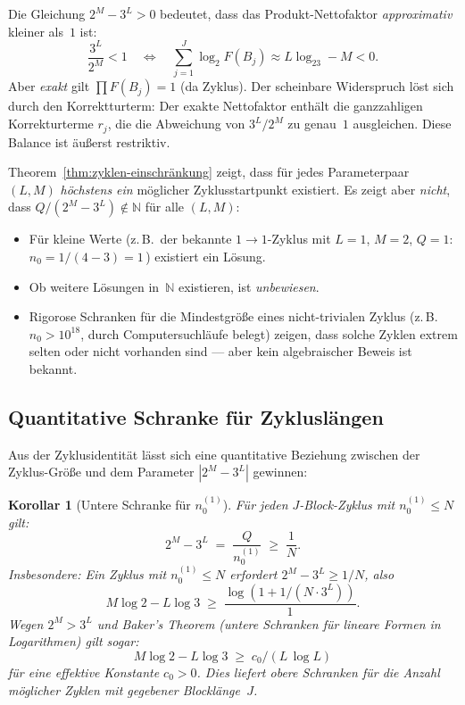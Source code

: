 \documentclass[12pt,a4paper]{article}
\newtheorem{korollar}[definition]{Korollar}
\newcommand{\N}{\mathbb{N}}
\newcommand{\logt}{\log_2}        %
\begin{document}
\begin{tcolorbox}[adisch, title={2-adische Interpretation}]
Die Gleichung $2^M - 3^L > 0$ bedeutet, dass das Produkt-Nettofaktor
\emph{approximativ} kleiner als~$1$ ist:
\[
  \frac{3^L}{2^M} < 1 \quad\Longleftrightarrow\quad
  \sum_{j=1}^{J}\logt F(B_j) \approx L\logt 3 - M < 0.
\]
Aber \emph{exakt} gilt $\prod F(B_j) = 1$ (da Zyklus). Der scheinbare
Widerspruch löst sich durch den Korrektturterm: Der exakte Nettofaktor
enthält die ganzzahligen Korrekturterme $r_j$, die die Abweichung von
$3^L/2^M$ zu genau~$1$ ausgleichen. Diese Balance ist äußerst restriktiv.
\end{tcolorbox}

\begin{tcolorbox}[lücke, title={Was die Zyklusidentität nicht beweist}]
Theorem~\ref{thm:zyklen-einschränkung} zeigt, dass für jedes Parameterpaar
$(L, M)$ \emph{höchstens ein} möglicher Zyklusstartpunkt existiert.
Es zeigt aber \emph{nicht}, dass $Q/(2^M-3^L) \notin \N$ für alle $(L,M)$:

\begin{itemize}[leftmargin=*]
  \item Für kleine Werte (z.\,B.\ der bekannte $1\to1$-Zyklus mit $L=1$,
    $M=2$, $Q=1$: $n_0 = 1/(4-3) = 1$\,\checkmark) existiert ein Lösung.
  \item Ob weitere Lösungen in~$\N$ existieren, ist \emph{unbewiesen}.
  \item Rigorose Schranken für die Mindestgröße eines nicht-trivialen Zyklus
    (z.\,B.\ $n_0 > 10^{18}$, durch Computersuchläufe belegt) zeigen, dass
    solche Zyklen extrem selten oder nicht vorhanden sind --- aber kein
    algebraischer Beweis ist bekannt.
\end{itemize}
\end{tcolorbox}

\subsection{Quantitative Schranke für Zykluslängen}

Aus der Zyklusidentität lässt sich eine quantitative Beziehung zwischen
der Zyklus-Größe und dem Parameter $|2^M - 3^L|$ gewinnen:

\begin{korollar}[Untere Schranke für $n_0^{(1)}$]
\label{kor:groesse}
Für jeden $J$-Block-Zyklus mit $n_0^{(1)} \leq N$ gilt:
\[
  2^M - 3^L \;=\; \frac{Q}{n_0^{(1)}} \;\geq\; \frac{1}{N}.
\]
Insbesondere: Ein Zyklus mit $n_0^{(1)} \leq N$ erfordert
$2^M - 3^L \geq 1/N$, also
\[
  M\log 2 - L\log 3 \;\geq\; \frac{\log(1 + 1/(N\cdot 3^L))}{1}.
\]
Wegen $2^M > 3^L$ und Baker's Theorem (untere Schranken für lineare
Formen in Logarithmen) gilt sogar:
\[
  M\log 2 - L\log 3 \;\geq\; c_0 / (L\,\log L)
\]
für eine effektive Konstante $c_0 > 0$. Dies liefert obere Schranken
für die Anzahl möglicher Zyklen mit gegebener Blocklänge~$J$.
\end{korollar}
\end{document}
